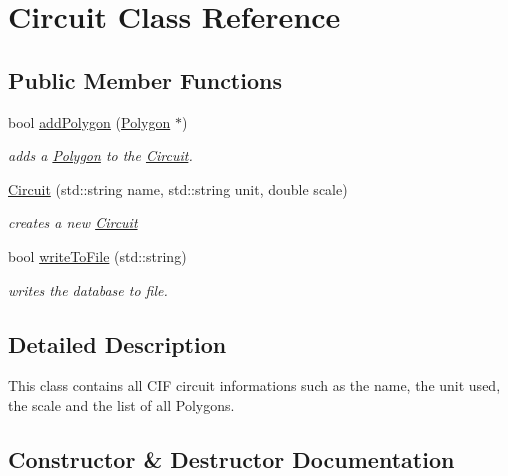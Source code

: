 \hypertarget{class_c_i_f_1_1_circuit}{}\section{Circuit Class Reference}
\label{class_c_i_f_1_1_circuit}
\subsection*{Public Member Functions}
\begin{DoxyCompactItemize}
\item 
bool \mbox{\hyperlink{class_c_i_f_1_1_circuit_a5b37e86206e2a128ba6db4987dc09a39}{add\+Polygon}} (\mbox{\hyperlink{class_c_i_f_1_1_polygon}{Polygon}} $\ast$)
\begin{DoxyCompactList}\small\item\em adds a \mbox{\hyperlink{class_c_i_f_1_1_polygon}{Polygon}} to the \mbox{\hyperlink{class_c_i_f_1_1_circuit}{Circuit}}. \end{DoxyCompactList}\item 
\mbox{\hyperlink{class_c_i_f_1_1_circuit_ad434e573e0ce37a59f39fa74fe9bfb79}{Circuit}} (std\+::string name, std\+::string unit, double scale)
\begin{DoxyCompactList}\small\item\em creates a new \mbox{\hyperlink{class_c_i_f_1_1_circuit}{Circuit}} \end{DoxyCompactList}\item 
bool \mbox{\hyperlink{class_c_i_f_1_1_circuit_a90c823b70c4984f302c19ceca604d101}{write\+To\+File}} (std\+::string)
\begin{DoxyCompactList}\small\item\em writes the database to file. \end{DoxyCompactList}\end{DoxyCompactItemize}


\subsection{Detailed Description}
This class contains all C\+IF circuit informations such as the name, the unit used, the scale and the list of all Polygons. 

\subsection{Constructor \& Destructor Documentation}
\mbox{\label{class_c_i_f_1_1_circuit_ad434e573e0ce37a59f39fa74fe9bfb79}} 
